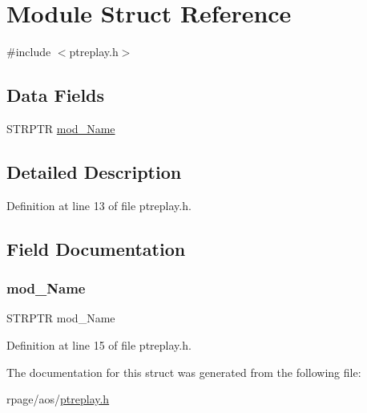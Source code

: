 \hypertarget{struct_module}{}\section{Module Struct Reference}
\label{struct_module}


{\ttfamily \#include $<$ptreplay.\+h$>$}

\subsection*{Data Fields}
\begin{DoxyCompactItemize}
\item 
S\+T\+R\+P\+TR \mbox{\hyperlink{struct_module_ad877244ff40a26d9fbbd46c6a2cf8b0f}{mod\+\_\+\+Name}}
\end{DoxyCompactItemize}


\subsection{Detailed Description}


Definition at line 13 of file ptreplay.\+h.



\subsection{Field Documentation}
\mbox{\label{struct_module_ad877244ff40a26d9fbbd46c6a2cf8b0f}} 
\subsubsection{\texorpdfstring{mod\_Name}{mod\_Name}}
{\footnotesize\ttfamily S\+T\+R\+P\+TR mod\+\_\+\+Name}



Definition at line 15 of file ptreplay.\+h.



The documentation for this struct was generated from the following file\+:\begin{DoxyCompactItemize}
\item 
rpage/aos/\mbox{\hyperlink{ptreplay_8h}{ptreplay.\+h}}\end{DoxyCompactItemize}
